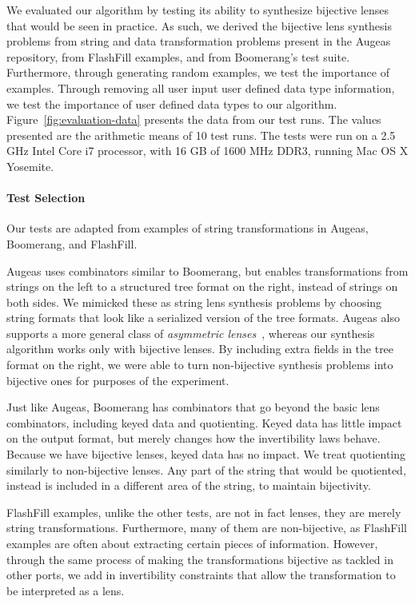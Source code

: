 \documentclass[numbers,10pt,preprint\ifanon ,nocopyrightspace\fi]{sigplanconf}
\begin{document}
We evaluated our algorithm by testing its ability to synthesize bijective lenses
that would be seen in practice.  As such, we derived the bijective lens synthesis problems
from string and data transformation problems present in the Augeas
repository, from FlashFill examples, and from Boomerang's test suite.
Furthermore, through generating random examples, we test the importance of
examples.  Through removing all user input user defined data type information,
we test the importance of user defined data types to our algorithm.
Figure~\ref{fig:evaluation-data} presents the data from our test runs.
The values presented are the arithmetic means of 10 test runs.
The tests were run on a 2.5 GHz Intel Core i7 processor, with
16 GB of 1600 MHz DDR3, running Mac OS X Yosemite.

\paragraph*{Test Selection}

Our tests are adapted from examples of string transformations in Augeas,
Boomerang, and FlashFill.

Augeas uses combinators similar to Boomerang, but enables transformations
from strings on the left to a structured tree format on the right, instead
of strings on both sides.  We mimicked these as string lens synthesis
problems by choosing string formats that look like a serialized version of
the tree formats.  Augeas also supports a more general class of {\em
  asymmetric lenses}~\cite{Focal2005-long}, whereas our synthesis algorithm
works only with bijective lenses.  By including extra fields in the tree
format on the right, we were able to turn non-bijective synthesis problems
into bijective ones for purposes of the experiment.

Just like Augeas, Boomerang has combinators that go beyond the basic lens
combinators, including keyed data and quotienting.  Keyed data has little impact
on the output format, but merely changes how the invertibility laws behave.  Because
we have bijective lenses, keyed data has no impact.  We treat quotienting
similarly to non-bijective lenses.  Any part of the string that would be
quotiented, instead is included in a different area of the string, to maintain
bijectivity.

FlashFill examples, unlike the other tests, are not in fact lenses, they are
merely string transformations.  Furthermore, many of them are non-bijective, as
FlashFill examples are often about extracting certain pieces of information.
However, through the same process of making the transformations bijective as
tackled in other ports, we
add in invertibility constraints that allow the transformation to be interpreted
as a lens.
\end{document}
